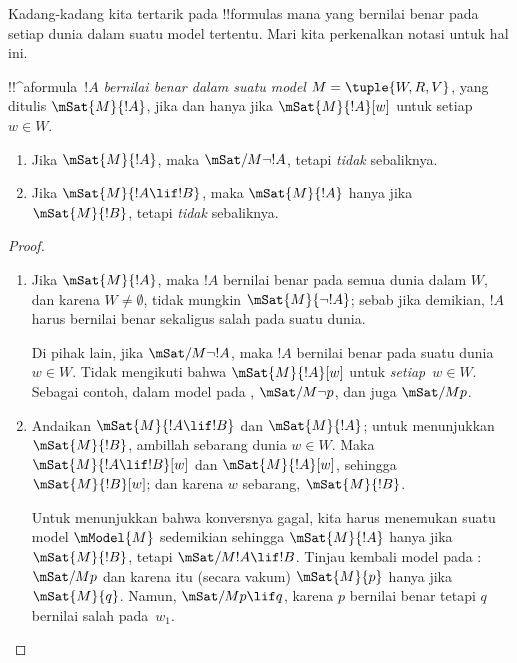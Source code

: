\documentclass[../../../include/open-logic-section]{subfiles}
\begin{document}


Kadang-kadang kita tertarik pada !!{formula}s mana yang bernilai benar pada
setiap dunia dalam suatu model tertentu. Mari kita perkenalkan notasi untuk
hal ini.

\begin{defn}
  !!^a{formula}~$!A$ \emph{bernilai benar dalam suatu model} $M = \tuple{W,
    R, V}$, yang ditulis $\mSat{M}{!A}$, jika dan hanya jika
  $\mSat{M}{!A}[w]$ untuk setiap $w \in W$.
\end{defn}

\begin{prop}
  \begin{enumerate}
  \item Jika $\mSat{M}{!A}$, maka $\mSat/{M}{\lnot !A}$, tetapi
    \emph{tidak} sebaliknya.
  \item Jika $\mSat{M}{!A \lif !B}$, maka $\mSat{M}{!A}$ hanya jika
    $\mSat{M}{!B}$, tetapi \emph{tidak} sebaliknya.
  \end{enumerate}
\end{prop}

\begin{proof}
  \begin{enumerate}
  \item Jika $\mSat{M}{!A}$, maka $!A$ bernilai benar pada semua dunia dalam
    $W$, dan karena $W \neq \emptyset$, tidak mungkin
    $\mSat{M}{\lnot!A}$; sebab jika demikian, $!A$ harus bernilai benar
    sekaligus salah pada suatu dunia.

    Di pihak lain, jika $\mSat/{M}{\lnot !A}$, maka $!A$ bernilai benar pada
    suatu dunia $w \in W$. Tidak mengikuti bahwa $\mSat{M}{!A}[w]$ untuk
    \emph{setiap}~$w \in W$. Sebagai contoh, dalam model pada
    , $\mSat/{M}{\lnot p}$, dan juga
    $\mSat/{M}{p}$.
  \item Andaikan $\mSat{M}{!A \lif !B}$ dan $\mSat{M}{!A}$; untuk
    menunjukkan $\mSat{M}{!B}$, ambillah sebarang dunia $w \in W$. Maka
    $\mSat{M}{!A \lif !B}[w]$ dan $\mSat{M}{!A}[w]$, sehingga
    $\mSat{M}{!B}[w]$; dan karena $w$ sebarang, $\mSat{M}{!B}$.

    Untuk menunjukkan bahwa konversnya gagal, kita harus menemukan suatu
    model $\mModel{M}$ sedemikian sehingga $\mSat{M}{!A}$ hanya jika
    $\mSat{M}{!B}$, tetapi $\mSat/{M}{!A \lif !B}$. Tinjau kembali model
    pada : $\mSat/{M}{p}$ dan karena itu (secara
    vakum) $\mSat{M}{p}$ hanya jika $\mSat{M}{q}$. Namun,
    $\mSat/{M}{p \lif q}$, karena $p$ bernilai benar tetapi $q$ bernilai
    salah pada~$w_1$.
  \end{enumerate}
\end{proof}
\end{document}

